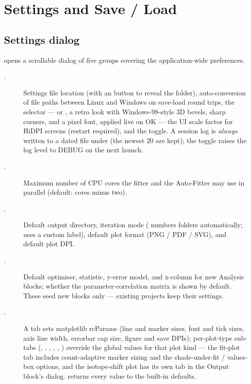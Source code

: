 \section{Settings and Save / Load}
\label{sec:settings}

\subsection{Settings dialog}

 opens a scrollable dialog of
five groups covering the application-wide preferences.

\begin{description}
    \item[.]
        Settings file location (with an  button to reveal
        the folder), auto-conversion of file paths between Linux and
        Windows on save-load round trips, the  selector
        ---  or , a retro
        look with Windows-98-style 3D bevels, sharp corners, and a
        pixel font, applied live on OK --- the UI scale factor for
        HiDPI screens (restart required), and the
         toggle. A session log is
        \emph{always} written to a dated file under 
        (the newest 20 are kept); the toggle raises the log level to
        DEBUG on the next launch.
    \item[.]
        Maximum number of CPU cores the fitter and the Auto-Fitter
        may use in parallel (default: cores minus two).
    \item[.]
        Default output directory, iteration mode (
        numbers  folders automatically; 
        uses a custom label), default plot format (PNG / PDF / SVG),
        and default plot DPI.
    \item[.]
        Default optimiser, statistic, y-error model, and x-column for
        new Analysis blocks; whether the parameter-correlation
        matrix is shown by default. These seed new blocks only ---
        existing projects keep their settings.
    \item[.]
        A  tab sets matplotlib rcParams (line and marker
        sizes, font and tick sizes, axis line width, errorbar cap
        size, figure and save DPIs); per-plot-type sub-tabs
        (, , ,
        , , )
        override the global values for that plot kind --- the
        fit-plot tab includes count-adaptive marker sizing and the
        shade-under-fit / values-box options, and the isotope-shift
        plot has its own tab in the Output block's
         dialog.  returns every value to the built-in defaults.
\end{description}

